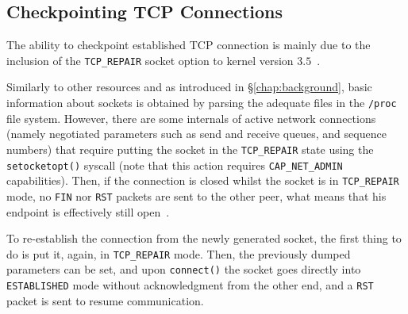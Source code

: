 %
%


\subsection{Checkpointing TCP Connections}

The ability to checkpoint established TCP connection is mainly due to the inclusion of the \texttt{TCP\_REPAIR} socket option to kernel version $3.5$~\cite{tcp-connection-repair}.

Similarly to other resources and as introduced in \S\ref{chap:background}, basic information about sockets is obtained by parsing the adequate files in the \texttt{/proc} file system.
However, there are some internals of active network connections (namely negotiated parameters such as send and receive queues, and sequence numbers) that require putting the socket in the \texttt{TCP\_REPAIR} state using the \texttt{setocketopt()} syscall (note that this action requires \texttt{CAP\_NET\_ADMIN} capabilities).
Then, if the connection is closed whilst the socket is in \texttt{TCP\_REPAIR} mode, no \texttt{FIN} nor \texttt{RST} packets are sent to the other peer, what means that his endpoint is effectively still open~\cite{Corbet12}.

To re-establish the connection from the newly generated socket, the first thing to do is put it, again, in \texttt{TCP\_REPAIR} mode.
Then, the previously dumped parameters can be set, and upon \texttt{connect()} the socket goes directly into \texttt{ESTABLISHED} mode without acknowledgment from the other end, and a \texttt{RST} packet is sent to resume communication.

